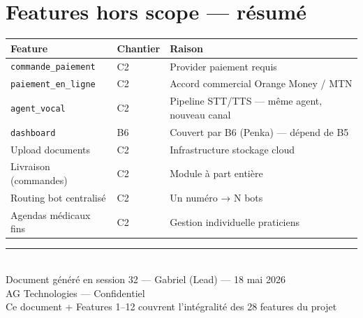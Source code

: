 \documentclass[11pt,a4paper]{article}
\newcommand{\slug}[1]{\texttt{\color{AGTDark}#1}}
\begin{document}
\section{Features hors scope — résumé}

\begin{center}
\begin{tabularx}{\textwidth}{llX}
\toprule
\textbf{Feature} & \textbf{Chantier} & \textbf{Raison} \\
\midrule
\slug{commande\_paiement} & C2 & Provider paiement requis \\
\slug{paiement\_en\_ligne} & C2 & Accord commercial Orange Money / MTN \\
\slug{agent\_vocal} & C2 & Pipeline STT/TTS — même agent, nouveau canal \\
\slug{dashboard} & B6 & Couvert par B6 (Penka) — dépend de B5 \\
Upload documents & C2 & Infrastructure stockage cloud \\
Livraison (commandes) & C2 & Module à part entière \\
Routing bot centralisé & C2 & Un numéro → N bots \\
Agendas médicaux fins & C2 & Gestion individuelle praticiens \\
\bottomrule
\end{tabularx}
\end{center}

\vfill
\begin{center}
\color{AGTGray}
\rule{0.5\textwidth}{0.4pt}\\[0.5em]
{\small Document généré en session 32 — Gabriel (Lead) — 18 mai 2026}\\
{\small AG Technologies — Confidentiel}\\
{\small Ce document + Features 1--12 couvrent l'intégralité des 28 features du projet}
\end{center}
\end{document}
